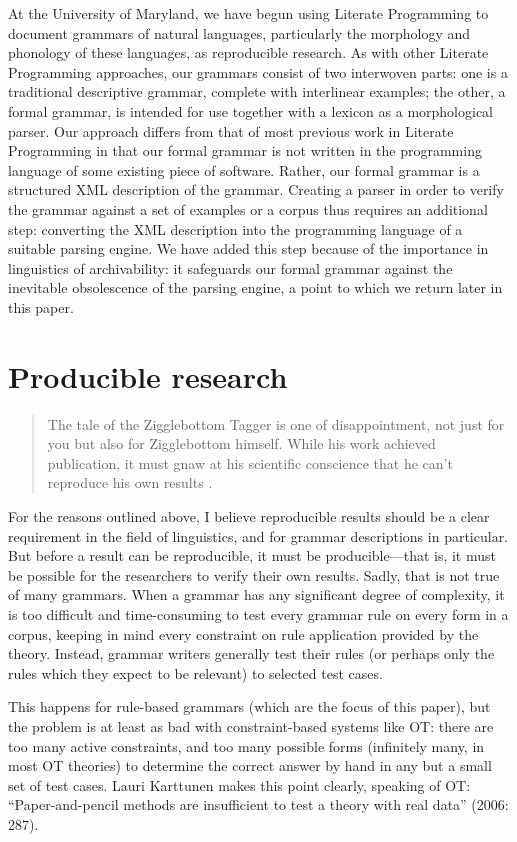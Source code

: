 At the University of Maryland, we have begun using Literate Programming to document grammars of natural languages, particularly the morphology and phonology of these languages, as reproducible research. As with other Literate Programming approaches, our grammars consist of two interwoven parts: one is a traditional descriptive grammar, complete with interlinear examples; the other, a formal grammar, is intended for use together with a lexicon as a morphological parser. Our approach differs from that of most previous work in Literate Programming in that our formal grammar is not written in the programming language of some existing piece of software. Rather, our formal grammar is a structured XML description of the grammar. Creating a parser in order to verify the grammar against a set of examples or a corpus thus requires an additional step: converting the XML description into the programming language of a suitable parsing engine. We have added this step because of the importance in linguistics of archivability: it safeguards our formal grammar against the inevitable obsolescence of the parsing engine, a point to which we return later in this paper.

\section{Producible research}
\begin{quote}
 The tale of the Zigglebottom Tagger is one of disappointment, not just for you but also for Zigglebottom himself. While his work achieved publication, it must gnaw at his scientific conscience that he can't reproduce his own results \citep{Pedersen2008}.
\end{quote}

For the reasons outlined above, I believe reproducible results should be a clear requirement in the field of linguistics, and for grammar descriptions in particular. But before a result can be reproducible, it must be producible---that is, it must be possible for the researchers to verify their own results. Sadly, that is not true of many grammars. When a grammar has any significant degree of complexity, it is too difficult and time-consuming to test every grammar rule on every form in a corpus, keeping in mind every constraint on rule application provided by the theory. Instead, grammar writers generally test their rules (or perhaps only the rules which they expect to be relevant) to selected test cases.

This happens for rule-based grammars (which are the focus of this paper), but the problem is at least as bad with constraint-based systems like OT: there are too many active constraints, and too many possible forms (infinitely many, in most OT theories) to determine the correct answer by hand in any but a small set of test cases. Lauri Karttunen makes this point clearly, speaking of OT: ``Paper-and-pencil methods are insufficient to test a theory with real data'' (2006: 287). \nocite{Karttunen2006}

